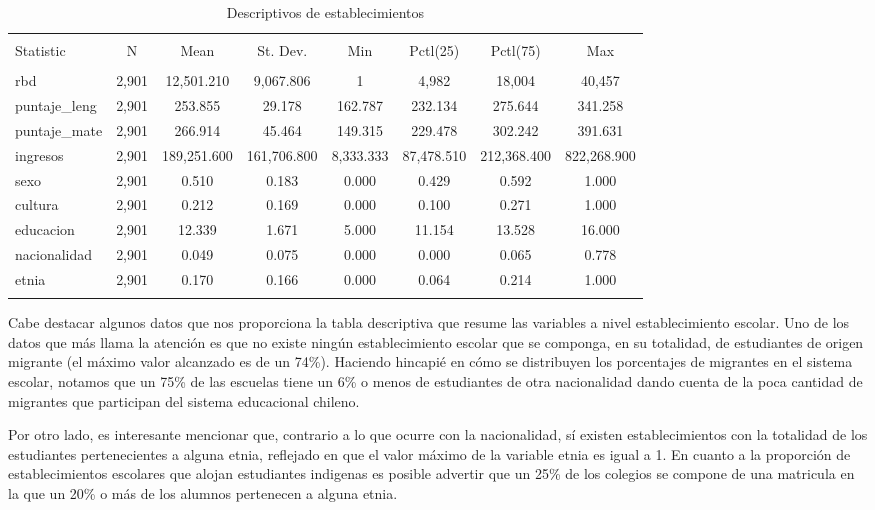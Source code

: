 \documentclass[
]{article}
\begin{document}
\begin{table}[!htbp] \centering 
  \caption{Descriptivos de establecimientos} 
  \label{} 
\begin{tabular}{@{\extracolsep{5pt}}lccccccc} 
\\[-1.8ex]\hline 
\hline \\[-1.8ex] 
Statistic & \multicolumn{1}{c}{N} & \multicolumn{1}{c}{Mean} & \multicolumn{1}{c}{St. Dev.} & \multicolumn{1}{c}{Min} & \multicolumn{1}{c}{Pctl(25)} & \multicolumn{1}{c}{Pctl(75)} & \multicolumn{1}{c}{Max} \\ 
\hline \\[-1.8ex] 
rbd & 2,901 & 12,501.210 & 9,067.806 & 1 & 4,982 & 18,004 & 40,457 \\ 
puntaje\_leng & 2,901 & 253.855 & 29.178 & 162.787 & 232.134 & 275.644 & 341.258 \\ 
puntaje\_mate & 2,901 & 266.914 & 45.464 & 149.315 & 229.478 & 302.242 & 391.631 \\ 
ingresos & 2,901 & 189,251.600 & 161,706.800 & 8,333.333 & 87,478.510 & 212,368.400 & 822,268.900 \\ 
sexo & 2,901 & 0.510 & 0.183 & 0.000 & 0.429 & 0.592 & 1.000 \\ 
cultura & 2,901 & 0.212 & 0.169 & 0.000 & 0.100 & 0.271 & 1.000 \\ 
educacion & 2,901 & 12.339 & 1.671 & 5.000 & 11.154 & 13.528 & 16.000 \\ 
nacionalidad & 2,901 & 0.049 & 0.075 & 0.000 & 0.000 & 0.065 & 0.778 \\ 
etnia & 2,901 & 0.170 & 0.166 & 0.000 & 0.064 & 0.214 & 1.000 \\ 
\hline \\[-1.8ex] 
\end{tabular} 
\end{table}

Cabe destacar algunos datos que nos proporciona la tabla descriptiva que
resume las variables a nivel establecimiento escolar. Uno de los datos
que más llama la atención es que no existe ningún establecimiento
escolar que se componga, en su totalidad, de estudiantes de origen
migrante (el máximo valor alcanzado es de un 74\%). Haciendo hincapié en
cómo se distribuyen los porcentajes de migrantes en el sistema escolar,
notamos que un 75\% de las escuelas tiene un 6\% o menos de estudiantes
de otra nacionalidad dando cuenta de la poca cantidad de migrantes que
participan del sistema educacional chileno.

Por otro lado, es interesante mencionar que, contrario a lo que ocurre
con la nacionalidad, sí existen establecimientos con la totalidad de los
estudiantes pertenecientes a alguna etnia, reflejado en que el valor
máximo de la variable etnia es igual a 1. En cuanto a la proporción de
establecimientos escolares que alojan estudiantes indigenas es posible
advertir que un 25\% de los colegios se compone de una matricula en la
que un 20\% o más de los alumnos pertenecen a alguna etnia.
\end{document}
